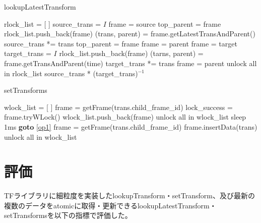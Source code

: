 \documentclass[a4paper]{jreport}	%
\begin{document}
\begin{algorithm}
  \caption{lookupLatestTransform}\label{algo:lookupLatestTransform}
\begin{algorithmic}[1]
	\State rlock\_list = [ ]
	\State source\_trans = $I$
	\State frame = source
	\State top\_parent = frame
	\State rlock\_list.push\_back(frame)
	\State (trans, parent) = frame.getLatestTransAndParent() 
	\State source\_trans *= trans
	\State top\_parent = frame
	\State frame = parent
	\EndWhile
	\State frame = target
	\State target\_trans = $I$
	\State rlock\_list.push\_back(frame)
	\State (tarns, parent) = frame.getTransAndParent(time)
	\State target\_trans *= trans
	\State frame = parent
	\EndWhile
	\State unlock all in rlock\_list
	\State \Return source\_trans * (target\_trans)$^{-1}$
	\EndFunction
\end{algorithmic}
\end{algorithm}


\begin{algorithm}
\caption{setTransforms}\label{algo:setTransforms}
\begin{algorithmic}[1]
	\State wlock\_list = [ ] \label{op1}
	\State frame = getFrame(trans.child\_frame\_id)
	\State lock\_success = frame.tryWLock()
	\State wlock\_list.push\_back(frame)
	\Else
	\State unlock all in wlock\_list
	\State sleep 1ms 
	\State \textbf{goto} \ref{op1}
	\EndIf
	\EndFor
	 
	\State frame = getFrame(trans.child\_frame\_id)
	\State frame.insertData(trans)
	\EndFor
	\State unlock all in wlock\_list
	\EndProcedure
\end{algorithmic}
\end{algorithm}

\chapter{評価}
TFライブラリに細粒度を実装したlookupTransform・setTransform、及び最新の複数のデータをatomicに取得・更新できるlookupLatestTransform・setTransformsを以下の指標で評価した。
\end{document}
